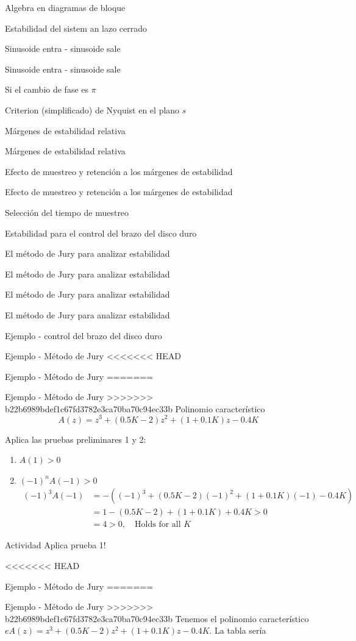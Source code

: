 \documentclass[presentation,aspectratio=169]{beamer}
\begin{document}
\begin{frame}[label={sec:org8e8e439}]{Algebra en diagramas de bloque}
\begin{frame}[label={sec:org5218f19}]{Estabilidad del sistem an lazo cerrado}
\begin{frame}[label={sec:org4ce2307}]{Sinusoide entra - sinusoide sale}
\begin{frame}[label={sec:orgc598966}]{Sinusoide entra - sinusoide sale}
\begin{frame}[label={sec:orgbd54147}]{Si el cambio de fase es \(\pi\)}
\begin{frame}[label={sec:orgf06388b}]{Criterion (simplificado) de Nyquist en el plano \(s\)}
\begin{frame}[label={sec:org5967884}]{Márgenes de estabilidad relativa}
\begin{frame}[label={sec:orgb5ba0e3}]{Márgenes de estabilidad relativa}
\begin{frame}[label={sec:orga8344a9}]{Efecto de muestreo y retención a los márgenes de estabilidad}
\begin{frame}[label={sec:org5e3653d}]{Efecto de muestreo y retención a los márgenes de estabilidad}
\begin{frame}[label={sec:orgd9a9d5d}]{Selección del tiempo de muestreo}
\begin{frame}[label={sec:org2cdebfb}]{Estabilidad para el control del brazo del disco duro}
\begin{frame}[label={sec:org6242817}]{El método de Jury para analizar estabilidad}
\begin{frame}[label={sec:org7c040d1}]{El método de Jury para analizar estabilidad}
\begin{frame}[label={sec:org85b11cd}]{El método de Jury para analizar estabilidad}
\begin{frame}[label={sec:org8bd183d}]{El método de Jury para analizar estabilidad}
\begin{frame}[label={sec:org4ec96eb}]{Ejemplo - control del brazo del disco duro}
\begin{frame}[label={sec:orgd803867}]{Ejemplo - Método de Jury}
<<<<<<< HEAD
\begin{frame}[label={sec:org8c0436d}]{Ejemplo - Método de Jury}
=======
\begin{frame}[label={sec:orgfad3831}]{Ejemplo - Método de Jury}
>>>>>>> b22b6989bdef1c67fd3782e3ca70ba70c94ec33b
Polinomio característico \[ A(z) = z^3 + (0.5K-2)z^2 + (1+0.1K)z - 0.4K\]

Aplica las pruebas preliminares 1 y 2:
\begin{enumerate}
\item \(A(1) > 0\)
\item \((-1)^nA(-1) > 0\)
\begin{align}
(-1)^3A(-1) &= -\left((-1)^3 + (0.5K-2)(-1)^2 + (1+0.1K)(-1) - 0.4K \right)\\
 &= 1-(0.5K-2) +(1+0.1K) + 0.4K > 0\\
 &=4 >0, \quad \text{Holds for all \(K\)}
 \end{align}
\end{enumerate}


\alert{Actividad} Aplica prueba 1!
\end{frame}

<<<<<<< HEAD
\begin{frame}[label={sec:org7f8ec49}]{Ejemplo - Método de Jury}
=======
\begin{frame}[label={sec:org01ff09a}]{Ejemplo - Método de Jury}
>>>>>>> b22b6989bdef1c67fd3782e3ca70ba70c94ec33b
Tenemos el polinomio característico \(e A(z) = z^3 + (0.5K-2)z^2 + (1+0.1K)z - 0.4K\). La tabla sería


\end{frame}
\end{frame}
\end{frame}
\end{frame}
\end{frame}
\end{frame}
\end{frame}
\end{frame}
\end{frame}
\end{frame}
\end{frame}
\end{frame}
\end{frame}
\end{frame}
\end{frame}
\end{frame}
\end{frame}
\end{frame}
\end{frame}
\end{frame}
\end{frame}
\end{document}
